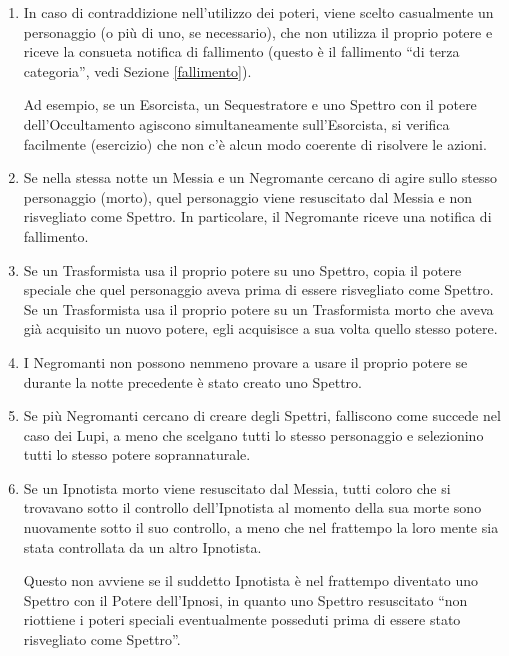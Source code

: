 \documentclass[a4paper,10pt]{article}
\begin{document}
\begin{enumerate}
 
 \item In caso di contraddizione nell'utilizzo dei poteri, viene scelto
casualmente un personaggio (o più di uno, se necessario), che non utilizza il
proprio potere e riceve la consueta notifica di fallimento (questo è il
fallimento ``di terza categoria'', vedi Sezione \ref{fallimento}).
 
 Ad esempio, se un Esorcista, un Sequestratore e uno Spettro con il potere
dell'Occultamento agiscono simultaneamente sull'Esorcista, si verifica
facilmente (esercizio) che non c'è alcun modo coerente di risolvere le azioni.
  
 \item Se nella stessa notte un Messia e un Negromante cercano di agire sullo
stesso personaggio (morto), quel personaggio viene resuscitato dal Messia e non
risvegliato come Spettro. In particolare, il Negromante riceve una notifica di
fallimento.

 \item Se un Trasformista usa il proprio potere su uno Spettro, copia il potere
speciale che quel personaggio aveva prima di essere risvegliato come Spettro.
 Se un Trasformista usa il proprio potere su un Trasformista morto che aveva già
acquisito un nuovo potere, egli acquisisce a sua volta quello stesso potere.
 
 \item I Negromanti non possono nemmeno provare a usare il proprio potere se
durante la notte precedente è stato creato uno Spettro.
 
 \item Se più Negromanti cercano di creare degli Spettri, falliscono come
succede nel caso dei Lupi, a meno che scelgano tutti lo stesso personaggio e
selezionino tutti lo stesso potere soprannaturale.

 \item Se un Ipnotista morto viene resuscitato dal Messia, tutti coloro che si
trovavano sotto il controllo dell'Ipnotista al momento della sua morte sono
nuovamente sotto il suo controllo, a meno che nel frattempo la loro mente sia
stata controllata da un altro Ipnotista.

Questo non avviene se il suddetto Ipnotista è nel frattempo diventato uno Spettro
con il Potere dell'Ipnosi, in quanto uno Spettro resuscitato ``non riottiene i poteri
speciali eventualmente posseduti prima di essere stato risvegliato come Spettro''.
 

\end{enumerate}
\end{document}
